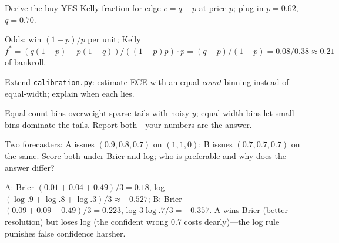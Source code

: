 \begin{exercise}[hard]
Derive the buy-YES Kelly fraction for edge $e=q-p$ at price $p$; plug in $p{=}0.62$, $q{=}0.70$.
\end{exercise}
\begin{solution}
Odds: win $(1-p)/p$ per unit; Kelly $f^*=(q(1-p)-p(1-q))/((1-p)p)\cdot p=(q-p)/(1-p)
=0.08/0.38\approx0.21$ of bankroll.
\end{solution}

\begin{exercise}[hard]
Extend \texttt{calibration.py}: estimate ECE with an equal-\emph{count} binning instead of
equal-width; explain when each lies.
\end{exercise}
\begin{solution}
Equal-count bins overweight sparse tails with noisy $\bar y$; equal-width bins let small bins
dominate the tails. Report both---your numbers are the answer.
\end{solution}

\begin{exercise}[hard]
Two forecasters: A issues $(0.9,0.8,0.7)$ on $(1,1,0)$; B issues $(0.7,0.7,0.7)$ on the same.
Score both under Brier and log; who is preferable and why does the answer differ?
\end{exercise}
\begin{solution}
A: Brier $(0.01+0.04+0.49)/3=0.18$, log $(\log.9+\log.8+\log.3)/3\approx-0.527$;
B: Brier $(0.09+0.09+0.49)/3=0.223$, log $3\log.7/3=-0.357$. A wins Brier (better resolution)
but loses log (the confident wrong 0.7 costs dearly)---the log rule punishes false confidence
harsher.
\end{solution}


